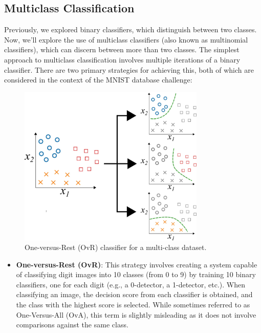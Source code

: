 \documentclass[12pt,letter]{article}
\begin{document}
\subsection{Multiclass Classification}
Previously, we explored binary classifiers, which distinguish between two classes. Now, we'll explore the use of multiclass classifiers (also known as multinomial classifiers), which can discern between more than two classes. The simplest approach to multiclass classification involves multiple iterations of a binary classifier. There are two primary strategies for achieving this, both of which are considered in the context of the MNIST database challenge:

\begin{figure}[H]
    \centering
    \includegraphics[width=3.5in]{../figures/one_vs_rest}
    \caption{One-versus-Rest (OvR) classifier for a multi-class dataset.}
    \label{fig:one_vs_rest}
\end{figure}

\begin{itemize}
\item \textbf{One-versus-Rest (OvR)}: This strategy involves creating a system capable of classifying digit images into 10 classes (from 0 to 9) by training 10 binary classifiers, one for each digit (e.g., a 0-detector, a 1-detector, etc.). When classifying an image, the decision score from each classifier is obtained, and the class with the highest score is selected. While sometimes referred to as One-Versus-All (OvA), this term is slightly misleading as it does not involve comparisons against the same class.
\end{itemize}
\end{document}
